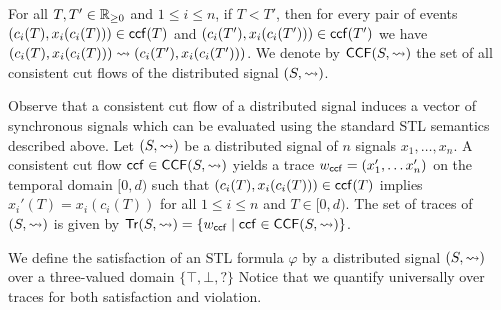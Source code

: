 For all $T,T' \in \mathbb{R}_{\geq 0}$ and $1 \leq i \leq n$, if $T < T'$, then for every pair of events $(c_i(T), x_i(c_i(T))) \in \mathsf{ccf}(T)$ and $(c_i(T'), x_i(c_i(T'))) \in \mathsf{ccf}(T')$ we have $(c_i(T), x_i(c_i(T))) \rightsquigarrow (c_i(T'), x_i(c_i(T')))$.
We denote by $\mathsf{CCF}(S,{\rightsquigarrow})$ the set of all consistent cut flows of the distributed signal $(S,{\rightsquigarrow})$.






Observe that a consistent cut flow of a distributed signal induces a vector of synchronous signals which can be evaluated using the standard STL semantics described above.
Let $(S,{\rightsquigarrow})$ be a distributed signal of $n$ signals $x_1, \ldots, x_n$.
A consistent cut flow $\mathsf{ccf} \in \mathsf{CCF}(S,{\rightsquigarrow})$ yields a trace $w_{\mathsf{ccf}} = (x'_1, \ldots x'_n)$ on the temporal domain $[0,d)$ such that $(c_i(T), x_i(c_i(T))) \in \mathsf{ccf}(T)$ implies $x_i'(T) = x_i(c_i(T))$ for all $1 \leq i \leq n$ and $T \in [0, d)$.
The set of traces of $(S,{\rightsquigarrow})$ is given by $\tr(S,{\hb}) = \{ w_{\ccf} \st \ccf \in \CCF(S,{\hb})\}$.

We define the satisfaction of an STL formula $\varphi$ by a distributed signal $(S,{\rightsquigarrow})$ over a three-valued domain $\{\top, \bot, {?}\}$
Notice that we quantify universally over traces for both satisfaction and violation.

